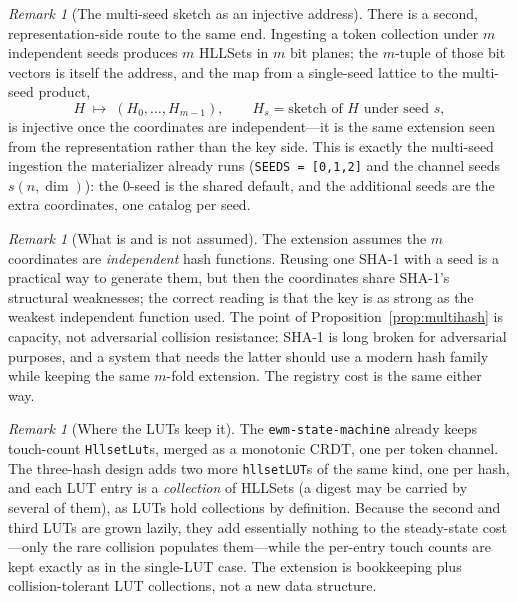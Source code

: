 \documentclass[11pt,a4paper]{article}
\theoremstyle{remark}
\newtheorem{remark}[theorem]{Remark}
\begin{document}
\begin{remark}[The multi-seed sketch as an injective address]
There is a second, representation-side route to the same end. Ingesting a
token collection under $m$ independent seeds produces $m$ HLLSets in $m$ bit
planes; the $m$-tuple of those bit vectors is itself the address, and the map
from a single-seed lattice to the multi-seed product,
\begin{equation}
  H \;\longmapsto\; (H_0,\dots,H_{m-1}), \qquad H_s = \text{sketch of } H
  \text{ under seed } s,
\end{equation}
is injective once the coordinates are independent---it is the same extension
seen from the representation rather than the key side. This is exactly the
multi-seed ingestion the materializer already runs (\texttt{SEEDS = [0,1,2]}
and the channel seeds $s(n,\dim)$): the $0$-seed is the shared default, and the
additional seeds are the extra coordinates, one catalog per seed.
\end{remark}

\begin{remark}[What is and is not assumed]
The extension assumes the $m$ coordinates are \emph{independent} hash
functions. Reusing one SHA-1 with a seed is a practical way to generate them,
but then the coordinates share SHA-1's structural weaknesses; the correct
reading is that the key is as strong as the weakest independent function used.
The point of Proposition~\ref{prop:multihash} is capacity, not adversarial
collision resistance: SHA-1 is long broken for adversarial purposes, and a
system that needs the latter should use a modern hash family while keeping the
same $m$-fold extension. The registry cost is the same either way.
\end{remark}

\begin{remark}[Where the LUTs keep it]
The \texttt{ewm-state-machine} already keeps touch-count \texttt{HllsetLut}s,
merged as a monotonic CRDT, one per token channel. The three-hash design adds
two more \texttt{hllsetLUT}s of the same kind, one per hash, and each LUT entry
is a \emph{collection} of HLLSets (a digest may be carried by several of them),
as LUTs hold collections by definition. Because the second and third LUTs are
grown lazily, they add essentially nothing to the steady-state cost---only the
rare collision populates them---while the per-entry touch counts are kept
exactly as in the single-LUT case. The extension is bookkeeping plus
collision-tolerant LUT collections, not a new data structure.
\end{remark}
\end{document}
